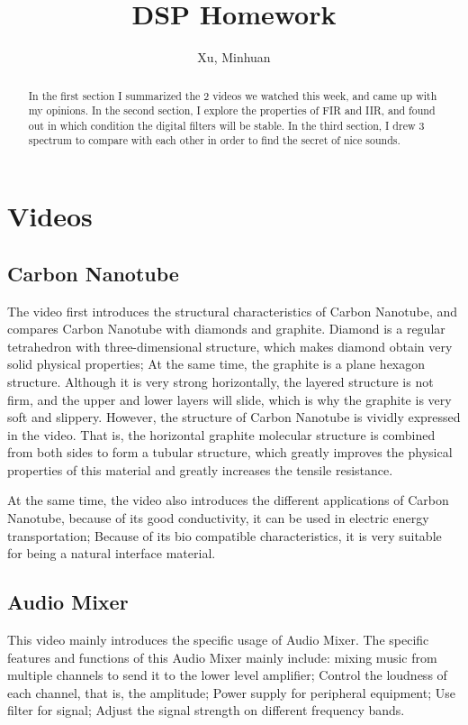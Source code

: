 \documentclass{article}
\begin{document}
\title{DSP Homework}
\author{Xu, Minhuan}
\maketitle
\tableofcontents
\begin{abstract}
In the first section I summarized the 2 videos we watched this week, and came up with my opinions. In the second section, I explore the properties of FIR and IIR, and found out in which condition the digital	filters will be stable. In the third section, I drew 3 spectrum to compare with each other in order to find the secret of nice sounds.
\end{abstract}

\section{Videos}
\subsection{Carbon Nanotube}
The video first introduces the structural characteristics of Carbon Nanotube, and compares Carbon Nanotube with diamonds and graphite. Diamond is a regular tetrahedron with three-dimensional structure, which makes diamond obtain very solid physical properties; At the same time, the graphite is a plane hexagon structure. Although it is very strong horizontally, the layered structure is not firm, and the upper and lower layers will slide, which is why the graphite is very soft and slippery. However, the structure of Carbon Nanotube is vividly expressed in the video. That is, the horizontal graphite molecular structure is combined from both sides to form a tubular structure, which greatly improves the physical properties of this material and greatly increases the tensile resistance.

At the same time, the video also introduces the different applications of Carbon Nanotube, because of its good conductivity, it can be used in electric energy transportation; Because of its bio compatible characteristics, it is very suitable for being a natural interface material.

\subsection{Audio Mixer}
This video mainly introduces the specific usage of Audio Mixer. The specific features and functions of this Audio Mixer mainly include: mixing music from multiple channels to send it to the lower level amplifier; Control the loudness of each channel, that is, the amplitude; Power supply for peripheral equipment; Use filter for signal; Adjust the signal strength on different frequency bands.
\end{document}
